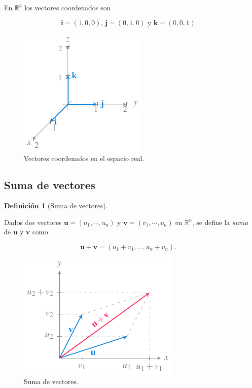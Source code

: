 \documentclass[
  a4paper,
]{scrreport}
\theoremstyle{definition}
\theoremstyle{plain}
\theoremstyle{plain}
\theoremstyle{plain}
\theoremstyle{definition}
\newtheorem{definition}{Definición}[chapter]
\theoremstyle{remark}
\begin{document}
En \(\mathbb{R}^3\) los vectores coordenados son

\[\mathbf{i}=(1,0,0)\mbox{, }\mathbf{j}=(0,1,0) \mbox{ y } \mathbf{k}=(0,0,1)\]

\begin{figure}

{\centering \includegraphics{img/geometria-plano-espacio/vectores-coordenados-espacio.pdf}

}

\caption{Vectores coordenados en el espacio real.}

\end{figure}

\hypertarget{suma-de-vectores}{%
\subsection{Suma de vectores}\label{suma-de-vectores}}

\begin{definition}[Suma de
vectores]\protect\hypertarget{def-suma-vectores}{}\label{def-suma-vectores}

Dados dos vectores \(\mathbf{u}=(u_1,\cdots,u_n)\) y
\(\mathbf{v}=(v_1,\cdots,v_n)\) en \(\mathbb{R}^n\), se define la
\emph{suma} de \(\mathbf{u}\) y \(\mathbf{v}\) como

\[
\mathbf{u}+\mathbf{v} = (u_1+v_1,\ldots, u_n+v_n).
\]

\end{definition}

\begin{figure}

{\centering \includegraphics{img/geometria-plano-espacio/suma-vectores.pdf}

}

\caption{Suma de vectores.}

\end{figure}
\end{document}
